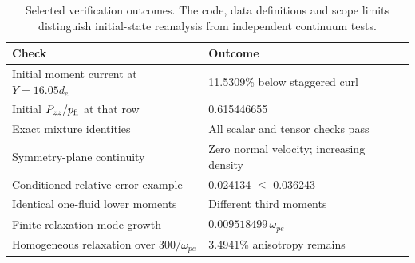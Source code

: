 \begin{table}[tbp]
\centering
\small
\caption{Selected verification outcomes. The code, data definitions and scope limits distinguish initial-state reanalysis from independent continuum tests.}
\label{tab:verification}
\begin{tabular}{p{.48\linewidth}p{.43\linewidth}}
\toprule
Check & Outcome \\
\midrule
Initial moment current at $Y=16.05d_e$ & 11.5309\% below staggered curl \\
Initial $P_{zz}/p_{\rm fl}$ at that row & 0.615446655 \\
Exact mixture identities & All scalar and tensor checks pass \\
Symmetry-plane continuity & Zero normal velocity; increasing density \\
Conditioned relative-error example & 0.024134 $\le$ 0.036243 \\
Identical one-fluid lower moments & Different third moments \\
Finite-relaxation mode growth & $0.009518499\,\omega_{pe}$ \\
Homogeneous relaxation over $300/\omega_{pe}$ & 3.4941\% anisotropy remains \\
\bottomrule
\end{tabular}
\end{table}
